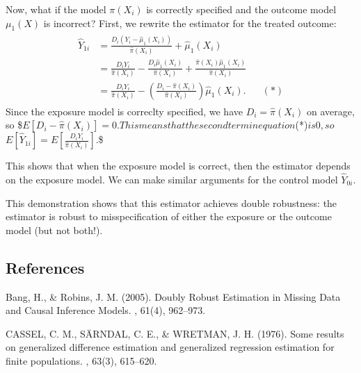 \documentclass[letterpaper,10pt,english]{jupyterBook}
\begin{document}
\sphinxAtStartPar
Now, what if the  model \(\pi(X_i)\) is correctly specified and the outcome model \(\mu_1(X)\) is incorrect? First, we rewrite the estimator for the treated outcome:
\begin{equation*}
\begin{split}\begin{aligned}
\hat Y_{1i}& = \frac{D_i(Y_i - \hat \mu_1 (X_i))}{\hat \pi (X_i)} + \hat \mu_1(X_i) \\
&= \frac{D_iY_i}{\hat \pi (X_i)} - \frac{D_i\hat \mu_1 (X_i)}{\hat \pi (X_i)} + \frac{\hat \pi (X_i)\hat \mu_1(X_i)}{\hat \pi (X_i)} \\
& = \frac{D_iY_i}{\hat \pi (X_i)} - \left( \frac{D_i - \hat \pi(X_i)}{\hat \pi (X_i)}\right) \hat \mu_1(X_i). &&(*)
\end{aligned}\end{split}
\end{equation*}
\sphinxAtStartPar
Since the exposure model is correclty specified, we have \(D_i = \hat \pi(X_i)\) on average, so
\$\(E[D_i - \hat \pi(X_i)] = 0.\)\(
This means that the second term in equation \)(*)\( is 0, so
\)\(E[\hat Y_{1i}]= E \left [ \frac{D_iY_i}{\hat \pi (X_i)}\right].\)\$

\sphinxAtStartPar
This shows that when the exposure model is correct, then the estimator depends  on the exposure model. We can make similar arguments for the control model \(\hat Y_{0i}\).

\sphinxAtStartPar
This demonstration shows that this estimator achieves double robustness: the estimator is robust to misspecification of either the exposure or the outcome model (but not both!).


\subsection{References}
\label{\detokenize{Introduction and Conceptual Overview:references}}
\sphinxAtStartPar
Bang, H., \& Robins, J. M. (2005). Doubly Robust Estimation in Missing Data and Causal Inference Models. , 61(4), 962–973. 

\sphinxAtStartPar
CASSEL, C. M., SÄRNDAL, C. E., \& WRETMAN, J. H. (1976). Some results on generalized difference estimation and generalized regression estimation for finite populations. , 63(3), 615–620. 
\end{document}
